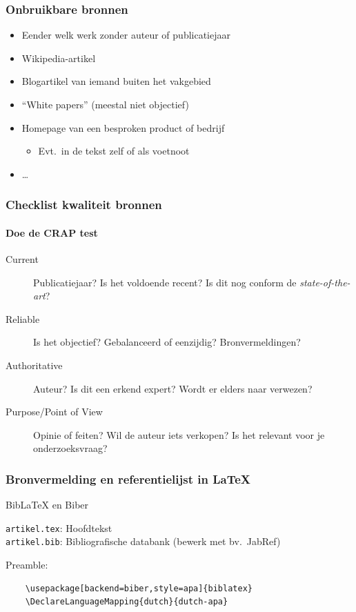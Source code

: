 \documentclass[aspectratio=169]{beamer}
\begin{document}
\begin{frame}
  \frametitle{Onbruikbare bronnen}

  \begin{itemize}
    \item Eender welk werk zonder auteur of publicatiejaar
    \item Wikipedia-artikel
    \item Blogartikel van iemand buiten het vakgebied
    \item ``White papers'' (meestal niet objectief)
    \item Homepage van een besproken product of bedrijf
      \begin{itemize}
        \item Evt.~in de tekst zelf of als voetnoot
      \end{itemize}
    \item \dots
  \end{itemize}
\end{frame}

\begin{frame}
  \frametitle{Checklist kwaliteit bronnen}
  \framesubtitle{Doe de CRAP test}

  \begin{description}
    \item[Current] Publicatiejaar? Is het voldoende recent? Is dit nog conform de \emph{state-of-the-art}?
    \item[Reliable] Is het objectief? Gebalanceerd of eenzijdig? 
    Bronvermeldingen?
    \item[Authoritative] Auteur? Is dit een erkend expert? Wordt er elders naar verwezen?
    \item[Purpose/Point of View] Opinie of feiten? Wil de auteur iets verkopen? Is het relevant voor je onderzoeksvraag?
  \end{description}

\end{frame}

\begin{frame}[fragile]
  \frametitle{Bronvermelding en referentielijst in {\LaTeX}}
  
  Bib{\LaTeX} en Biber

  \vspace{18pt}

  \verb|artikel.tex|: Hoofdtekst\\
  \verb|artikel.bib|: Bibliografische databank (bewerk met bv.~JabRef)

  \vspace{18pt}
  
  Preamble:
  
  \begin{verbatim}
    \usepackage[backend=biber,style=apa]{biblatex}
    \DeclareLanguageMapping{dutch}{dutch-apa}
    
  \end{verbatim}

\end{frame}
\end{document}
